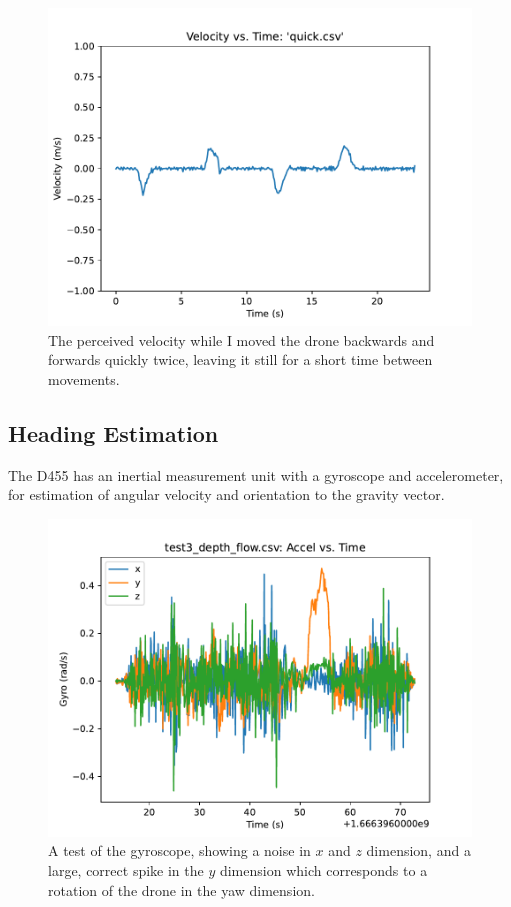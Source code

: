 \begin{figure}
	\centering
	\includegraphics[width=\linewidth]{./images/quick.pdf}
	\caption{The perceived velocity while I moved the drone backwards and forwards quickly twice, leaving it still for a short time between movements.}
	\label{figure:d455_velocity_quick}
\end{figure}

\subsection{Heading Estimation}

The D455 has an inertial measurement unit with a gyroscope and accelerometer,
for estimation of angular velocity and orientation to the gravity vector.


\begin{figure}[h]
	\includegraphics[width=\linewidth]{./images/test3_depth_flow_depth_gyro.pdf}
	\caption{A test of the gyroscope, showing a noise in $x$ and $z$ dimension,
	and a large, correct spike in the $y$ dimension which corresponds to a rotation of the drone
	in the yaw dimension.}
	\label{figure:test3_depth_gyro}
\end{figure}


